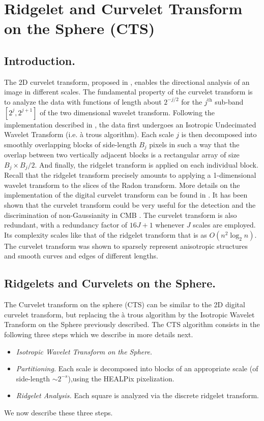\section{Ridgelet and Curvelet Transform on the Sphere (CTS) }
\label{sect_cur}
\subsection{Introduction.}

The 2D curvelet transform, proposed in \citep{cur:donoho99,starck:sta01_3,starck:sta02_3}, enables the directional analysis of an image 
in different scales. The fundamental property of the curvelet transform is to analyze the data with functions of length about $2^{-j/2}$ 
for the $j^{\textrm{th}}$ sub-band $[2^j, 2^{j+1}]$ of the two dimensional wavelet transform. Following the implementation described 
in \citep{starck:sta01_3,starck:sta02_3}, the data first undergoes an Isotropic Undecimated Wavelet Transform (i.e. \og{}\`a trous \fg{} algorithm). 
Each scale $j$ is then decomposed into smoothly overlapping blocks of side-length $B_j$ pixels in such a way that the overlap between two
vertically adjacent blocks is a rectangular array of size $B_j \times B_j/2$. And finally, the ridgelet transform \citep{cur:candes99_1} is 
applied on each individual block. Recall that the ridgelet transform precisely amounts to applying a 1-dimensional wavelet transform to the
slices of the Radon transform. More details on the implementation of the digital curvelet transform can be found in \citep{starck:sta01_3,starck:sta02_3}.
It has been shown that the curvelet transform could be very useful for the detection and the discrimination of non-Gaussianity in CMB \citep{starck:sta02_4}.
The curvelet transform is also redundant, with a redundancy factor of $16J+1$ whenever $J$ scales are employed. Its complexity scales like 
that of the ridgelet transform that is as $O(n^2 \log_2n)$. The curvelet transform was shown to sparsely represent anisotropic structures and smooth curves and edges of different lengths.

\subsection{Ridgelets and Curvelets on the Sphere.}
The Curvelet transform on the sphere (CTS) can be similar to the 2D digital curvelet transform, but replacing the \og{}\`a trous \fg{} algorithm 
by the Isotropic Wavelet Transform on the Sphere previously described. The CTS algorithm consists in the following three steps which 
we describe in more details next.
\begin{itemize}
\item {\it Isotropic Wavelet Transform on the Sphere.}  
\item {\it Partitioning.} Each scale is decomposed into blocks of an appropriate scale (of side-length $\sim2^{-s}$),using the HEALPix pixelization.
\item {\it Ridgelet Analysis.} Each square is analyzed via the discrete ridgelet transform.
\end{itemize}
We now describe these three steps.

